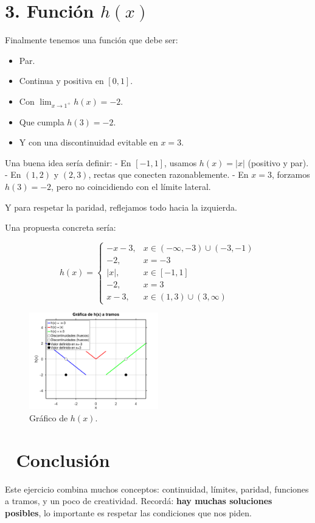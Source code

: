 \documentclass[12pt]{article}
\let\oldincludegraphics\includegraphics
\renewcommand{\includegraphics}[2][]{%
  \oldincludegraphics[width=0.5\textwidth,#1]{#2}%
}
\begin{document}
\section*{3. Función $h(x)$}
Finalmente tenemos una función que debe ser:
\begin{itemize}
  \item Par.
  \item Continua y positiva en $[0,1]$.
  \item Con $\lim_{x \to 1^+} h(x) = -2$.
  \item Que cumpla $h(3) = -2$.
  \item Y con una discontinuidad evitable en $x=3$.
\end{itemize}

Una buena idea sería definir:
- En $[-1,1]$, usamos $h(x) = |x|$ (positivo y par).
- En $(1,2)$ y $(2,3)$, rectas que conecten razonablemente.
- En $x=3$, forzamos $h(3) = -2$, pero no coincidiendo con el límite lateral.

Y para respetar la paridad, reflejamos todo hacia la izquierda.

Una propuesta concreta sería:

\begin{equation}
  h(x) = 
  \begin{cases}
    -x-3, & x \in (-\infty, -3) \cup (-3, -1) \\
    -2, & x = -3 \\
    |x|, & x \in [-1,1] \\
    -2, & x = 3 \\
    x-3, & x \in (1,3) \cup (3,\infty)
  \end{cases}
\end{equation}

\begin{figure}[H]
  \centering
  \includegraphics{img/h(x).png}
  \caption{Gráfico de $h(x)$.}
\end{figure}

\section*{{\emojifont 🎯} Conclusión}
Este ejercicio combina muchos conceptos: continuidad, límites, paridad, funciones a tramos, y un poco de creatividad.  
Recordá: \textbf{hay muchas soluciones posibles}, lo importante es respetar las condiciones que nos piden.
\end{document}

